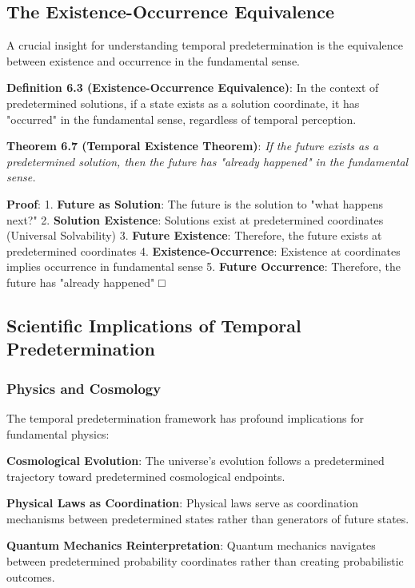 \documentclass[12pt,a4paper]{article}
\theoremstyle{definition}
\begin{document}
{\subsection{The Existence-Occurrence Equivalence}

A crucial insight for understanding temporal predetermination is the equivalence between existence and occurrence in the fundamental sense.

\textbf{Definition 6.3 (Existence-Occurrence Equivalence)}: In the context of predetermined solutions, if a state exists as a solution coordinate, it has "occurred" in the fundamental sense, regardless of temporal perception.

\textbf{Theorem 6.7 (Temporal Existence Theorem)}: \textit{If the future exists as a predetermined solution, then the future has "already happened" in the fundamental sense.}

\textbf{Proof}:
1. \textbf{Future as Solution}: The future is the solution to "what happens next?"
2. \textbf{Solution Existence}: Solutions exist at predetermined coordinates (Universal Solvability)
3. \textbf{Future Existence}: Therefore, the future exists at predetermined coordinates
4. \textbf{Existence-Occurrence}: Existence at coordinates implies occurrence in fundamental sense
5. \textbf{Future Occurrence}: Therefore, the future has "already happened" □

\subsection{Scientific Implications of Temporal Predetermination}

\subsubsection{Physics and Cosmology}

The temporal predetermination framework has profound implications for fundamental physics:

\textbf{Cosmological Evolution}: The universe's evolution follows a predetermined trajectory toward predetermined cosmological endpoints.

\textbf{Physical Laws as Coordination}: Physical laws serve as coordination mechanisms between predetermined states rather than generators of future states.

\textbf{Quantum Mechanics Reinterpretation}: Quantum mechanics navigates between predetermined probability coordinates rather than creating probabilistic outcomes.

}
\end{document}
